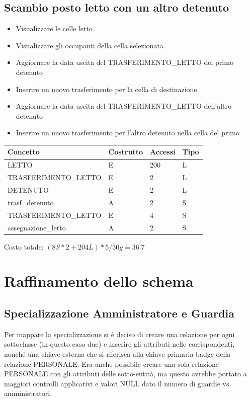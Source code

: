 \documentclass[a4paper,12pt]{report}
\begin{document}
\subsection{Scambio posto letto con un altro detenuto}
\begin{itemize}
    \item Visualizzare le celle letto
    \item Visualizzare gli occupanti della cella selezionata
    \item Aggiornare la data uscita del TRASFERIMENTO\_LETTO del primo detenuto
    \item Inserire un nuovo trasferimento per la cella di destinazione
    \item Aggiornare la data uscita del TRASFERIMENTO\_LETTO dell'altro detenuto
    \item Inserire un nuovo trasferimento per l'altro detenuto nella cella del primo
\end{itemize}
\begin{table}[H]
\begin{tabular}{p{5cm} p{2cm} p{1cm} p{1cm}}
\hline
Concetto & Costrutto & Accessi & Tipo \\ \hline
LETTO & E & 200 & L \\
TRASFERIMENTO\_LETTO & E & 2 & L \\
DETENUTO & E & 2 & L \\
trasf\_detenuto & A & 2 & S \\
TRASFERIMENTO\_LETTO & E & 4 & S \\
assegnazione\_letto & A & 2 & S \\
\end{tabular}
\end{table}
Costo totale: \((8S * 2 + 204L) * 5/30g = 36.7\)
\section{Raffinamento dello schema}
\subsection{Specializzazione Amministratore e Guardia}
Per mappare la specializzazione si è deciso di creare una relazione per ogni sottoclasse (in questo caso due) e inserire gli attributi nelle corrispondenti, nonché una chiave esterna che si riferisca alla chiave primaria badge della relazione PERSONALE.
%
Era anche possibile creare una sola relazione PERSONALE con gli attributi delle sotto-entità, ma questo avrebbe portato a maggiori controlli applicativi e valori NULL dato il numero di guardie vs amministratori.
\end{document}

